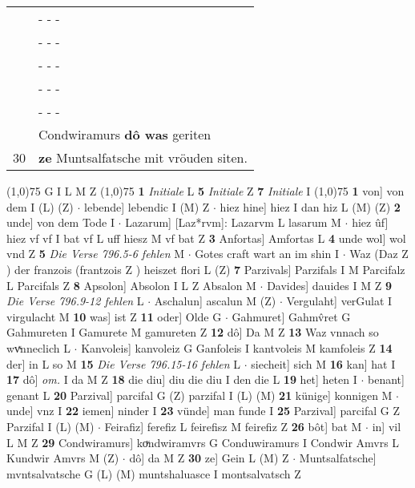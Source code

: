 \documentclass[8pt,a4paper,notitlepage]{article}
\begin{document}
\begin{table}[ht]
\begin{minipage}[t]{0.5\linewidth}
\begin{tabular}{rl}
 & \multicolumn{1}{l}{ - - - }\\ 
 & \multicolumn{1}{l}{ - - - }\\ 
 & \multicolumn{1}{l}{ - - - }\\ 
 & \multicolumn{1}{l}{ - - - }\\ 
 & \multicolumn{1}{l}{ - - - }\\ 
 & Condwiramurs \textbf{dô was} geriten\\ 
30 & \textbf{ze} Muntsalfatsche mit vröuden siten.\\ 
\end{tabular}
\scriptsize
\line(1,0){75} \newline
G I L M Z \newline
\line(1,0){75} \newline
\textbf{1} \textit{Initiale} L  \textbf{5} \textit{Initiale} Z  \textbf{7} \textit{Initiale} I  \newline
\line(1,0){75} \newline
\textbf{1} von] von dem I (L) (Z)  $\cdot$ lebende] lebendic I (M) Z  $\cdot$ hiez hine] hiez I dan hiz L (M) (Z) \textbf{2} unde] von dem Tode I  $\cdot$ Lazarum] [Laz*rvm]: Lazarvm L lasarum M  $\cdot$ hiez ûf] hiez vf vf I bat vf L uff hiesz M vf bat Z \textbf{3} Anfortas] Amfortas L \textbf{4} unde wol] wol vnd Z \textbf{5} \textit{Die Verse 796.5-6 fehlen} M   $\cdot$ Gotes craft wart an im shin I  $\cdot$ Waz (Daz Z ) der franzois (frantzois Z ) heiszet flori L (Z) \textbf{7} Parzivals] Parzifals I M Parcifalz L Parcifals Z \textbf{8} Apsolon] Absolon I L Z Absalon M  $\cdot$ Davides] dauides I M Z \textbf{9} \textit{Die Verse 796.9-12 fehlen} L   $\cdot$ Aschalun] ascalun M (Z)  $\cdot$ Vergulaht] verGulat I virgulacht M \textbf{10} was] ist Z \textbf{11} oder] Olde G  $\cdot$ Gahmuret] Gahmv̂ret G Gahmureten I Gamurete M gamureten Z \textbf{12} dô] Da M Z \textbf{13} Waz vnnach so wvͯnneclich L  $\cdot$ Kanvoleis] kanvoleiz G Ganfoleis I kantvoleis M kamfoleis Z \textbf{14} der] in L so M \textbf{15} \textit{Die Verse 796.15-16 fehlen} L   $\cdot$ siecheit] sich M \textbf{16} kan] hat I \textbf{17} dô] \textit{om.} I da M Z \textbf{18} die diu] diu die diu I den die L \textbf{19} het] heten I  $\cdot$ benant] genant L \textbf{20} Parzival] parcifal G (Z) parzifal I (L) (M) \textbf{21} künige] konnigen M  $\cdot$ unde] vnz I \textbf{22} iemen] ninder I \textbf{23} vünde] man funde I \textbf{25} Parzival] parcifal G Z Parzifal I (L) (M)  $\cdot$ Feirafiz] ferefiz L feirefisz M feirefiz Z \textbf{26} bôt] bat M  $\cdot$ in] vil L M Z \textbf{29} Condwiramurs] koͮndwiramvrs G Conduwiramurs I Condwir Amvrs L Kundwir Amvrs M (Z)  $\cdot$ dô] da M Z \textbf{30} ze] Gein L (M) Z  $\cdot$ Muntsalfatsche] mvntsalvatsche G (L) (M) muntshaluasce I montsalvatsch Z \newline

\end{minipage}
\end{table}
\end{document}

